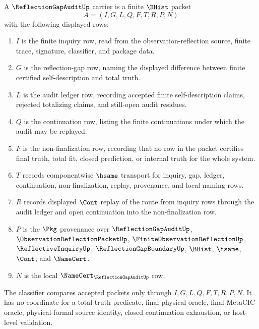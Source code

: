 \begin{definition}
\label{def:reflection-gap-audit-carrier}
A $\ReflectionGapAuditUp$ carrier is a finite $\BHist$ packet
$$
A=(I,G,L,Q,F,T,R,P,N)
$$
with the following displayed rows:
\begin{enumerate}
\item $I$ is the finite inquiry row, read from the observation-reflection source, finite trace, signature, classifier, and package data.
\item $G$ is the reflection-gap row, naming the displayed difference between finite certified self-description and total truth.
\item $L$ is the audit ledger row, recording accepted finite self-description claims, rejected totalizing claims, and still-open audit residues.
\item $Q$ is the continuation row, listing the finite continuations under which the audit may be replayed.
\item $F$ is the non-finalization row, recording that no row in the packet certifies final truth, total fit, closed prediction, or internal truth for the whole system.
\item $T$ records componentwise $\hsame$ transport for inquiry, gap, ledger, continuation, non-finalization, replay, provenance, and local naming rows.
\item $R$ records displayed $\Cont$ replay of the route from inquiry rows through the audit ledger and open continuation into the non-finalization row.
\item $P$ is the $\Pkg$ provenance over $\ReflectionGapAuditUp$, $\ObservationReflectionPacketUp$, $\FiniteObservationReflectionUp$, $\ReflectiveInquiryUp$, $\ReflectionGapBoundaryUp$, $\BHist$, $\hsame$, $\Cont$, and $\NameCert$.
\item $N$ is the local $\NameCert_{\ReflectionGapAuditUp}$ row.
\end{enumerate}
The classifier compares accepted packets only through $I,G,L,Q,F,T,R,P,N$. It has no coordinate for a total truth predicate, final physical oracle, final MetaCIC oracle, physical-formal source identity, closed continuation exhaustion, or host-level validation.
\end{definition}

